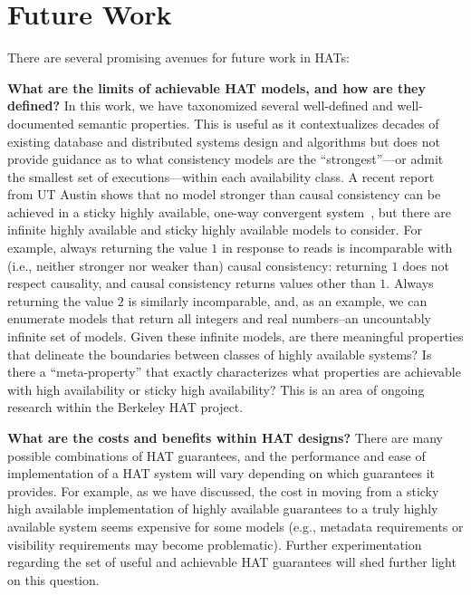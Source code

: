 
\section{Future Work}
\label{sec:futurework}

There are several promising avenues for future work in HATs:

\textbf{What are the limits of achievable HAT models, and how are they
  defined?}  In this work, we have taxonomized several well-defined
and well-documented semantic properties. This is useful as it
contextualizes decades of existing database and distributed systems
design and algorithms but does not provide guidance as to what
consistency models are the ``strongest''---or admit the smallest set
of executions---within each availability class. A recent report from
UT Austin shows that no model stronger than causal consistency can be
achieved in a sticky highly available, one-way convergent
system~\cite{cac}, but there are infinite highly available and sticky
highly available models to consider. For example, always returning the
value $1$ in response to reads is incomparable with (i.e., neither
stronger nor weaker than) causal consistency: returning $1$ does not
respect causality, and causal consistency returns values other than
$1$. Always returning the value $2$ is similarly incomparable, and, as
an example, we can enumerate models that return all integers and real
numbers--an uncountably infinite set of models. Given these infinite
models, are there meaningful properties that delineate the boundaries
between classes of highly available systems? Is there a
``meta-property'' that exactly characterizes what properties are
achievable with high availability or sticky high availability? This is
an area of ongoing research within the Berkeley HAT project.

\textbf{What are the costs and benefits within HAT designs?} There are
many possible combinations of HAT guarantees, and the performance and
ease of implementation of a HAT system will vary depending on which
guarantees it provides. For example, as we have discussed, the cost in
moving from a sticky high available implementation of highly available
guarantees to a truly highly available system seems expensive for some
models (e.g., metadata requirements or visibility requirements may
become problematic). Further experimentation regarding the set of
useful and achievable HAT guarantees will shed further light on this
question.

